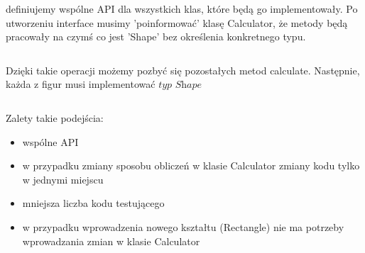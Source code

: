 \documentclass[11pt]{article}
\begin{document}
definiujemy wspólne API dla wszystkich klas, które będą go implementowały. Po utworzeniu interface musimy 'poinformować' klasę Calculator, że metody będą pracowały na czymś co jest 'Shape' bez określenia konkretnego typu. 

\inputminted[bgcolor=bg,linenos=true]{java}{src/w05/CalculatorRefactor.java}

Dzięki takie operacji możemy pozbyć się pozostałych metod calculate. Następnie, każda z figur musi implementować $\textit{typ Shape}$ 

\inputminted[bgcolor=bg,linenos=true]{java}{src/w05/Calculatorinterface.java}

Zalety takie podejścia:
\begin{itemize}
\item wspólne API
\item w przypadku zmiany sposobu obliczeń w klasie Calculator zmiany kodu tylko w jednymi miejscu
\item mniejsza liczba kodu testującego
\item w przypadku wprowadzenia nowego kształtu (Rectangle) nie ma potrzeby wprowadzania zmian w klasie Calculator
\end{itemize}
\end{document}
